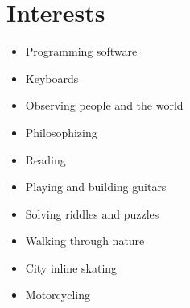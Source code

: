 \documentclass[]{friggeri-cv} %
\begin{document}

\section{Interests}

\begin{multicols}{2}
   \begin{itemize}
      \item Programming software
      \item Keyboards
      \item Observing people and the world
      \item Philosophizing
      \item Reading
      \item Playing and building guitars
      \item Solving riddles and puzzles
      \item Walking through nature
      \item City inline skating
      \item Motorcycling
   \end{itemize}
\end{multicols}


\end{document}

